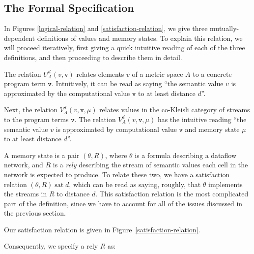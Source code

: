 \documentclass[preprint]{sigplanconf}
\newcommand{\term}[1]{\ensuremath{\mathtt{{#1}}}}
\newcommand{\satisfy}[2]{{#1}\;\mathrm{sat}\;{#2}}
\begin{document}
\subsection{The Formal Specification}

In Figures \ref{logical-relation} and \ref{satisfaction-relation}, we
give three mutually-dependent definitions of values and memory
states. To explain this relation, we will proceed iteratively, first
giving a quick intuitive reading of each of the three definitions, 
and then proceeding to describe them in detail. 

The relation $U^d_A(v, \term{v})$ relates elements $v$ of a metric
space $A$ to a concrete program term \term{v}. Intuitively, it can be
read as saying ``the semantic value $v$ is approximated by the
computational value \term{v} to at least distance $d$''. 

Next, the relation $V^d_A(v, \term{v}, \mu)$ relates values in the
co-Kleisli category of streams to the program terms \term{v}. The
relation $V^d_A(v, \term{v}, \mu)$ has the intuitive reading ``the
semantic value $v$ is approximated by computational value \term{v} and
memory state $\mu$ to at least distance $d$''.

A memory state is a pair $(\theta, R)$, where $\theta$ is a formula
describing a dataflow network, and $R$ is a \emph{rely} describing the
stream of semantic values each cell in the network is expected to
produce. To relate these two, we have a satisfaction relation
$\satisfy{(\theta, R)}{d}$, which can be read as saying, roughly, that
$\theta$ implements the streams in $R$ to distance $d$. This
satisfaction relation is the most complicated part of the definition,
since we have to account for all of the issues discussed in the
previous section.

Our satisfaction relation is given in Figure~\ref{satisfaction-relation}. 



Consequently, we specify a rely $R$ as:
\end{document}
